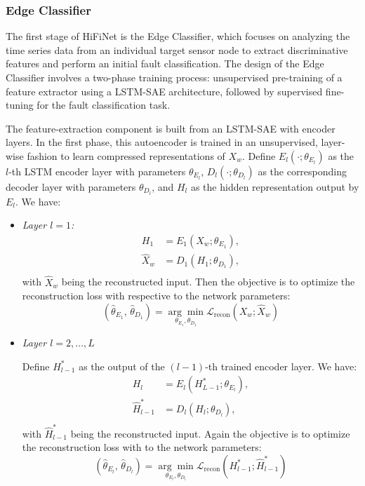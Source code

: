 \subsubsection{Edge Classifier}
The first stage of HiFiNet is the Edge Classifier, which focuses on analyzing the time series data from an individual target sensor node to extract discriminative features and perform an initial fault classification. The design of the Edge Classifier involves a two-phase training process: unsupervised pre-training of a feature extractor using a LSTM-SAE architecture, followed by supervised fine-tuning for the fault classification task.

The feature-extraction component is built from an LSTM-SAE with encoder layers. In the first phase, this autoencoder is trained in an unsupervised, layer-wise fashion to learn compressed representations of \(X_w\). Define \(E_l(\cdot; \theta_{E_l})\) as the \(l\)-th LSTM encoder layer with parameters \(\theta_{E_l}\), \(D_l(\cdot; \theta_{D_l})\) as the corresponding decoder layer with parameters \(\theta_{D_l}\), and \(H_l\) as the hidden representation output by \(E_l\). We have:
\begin{itemize}
  \item \emph{Layer \(l=1\):}
    \begin{equation}
      \begin{aligned}
        H_1 &= E_1(X_w; \theta_{E_1}), \\
        \hat X_w &= D_1(H_1; \theta_{D_1}), \\
      \end{aligned}
    \end{equation}
    with \(\hat X_w\) being the reconstructed input. Then the objective is to optimize the reconstruction loss with respective to the network parameters:
    \begin{equation}
      (\hat \theta_{E_1},\,\hat \theta_{D_1}) = \underset{\theta_{E_1}, \theta_{D_1}} {\arg\min} \mathcal L_{\text{recon}}(X_w; \hat X_w)
    \end{equation}
  \item \emph{Layer \(l = 2, \ldots, L\)}

    Define \(H^*_{l-1}\) as the output of the \((l-1)\)-th trained encoder layer. We have:
    \begin{equation}
      \begin{aligned}
        H_l &= E_l(H^*_{L-1}; \theta_{E_l}), \\ 
        \hat H^*_{l-1} &= D_l(H_l; \theta_{D_l}), \\
      \end{aligned}
    \end{equation}
    with \(\hat H^*_{l-1}\) being the reconstructed input. Again the objective is to optimize the reconstruction loss with to the network parameters:
\begin{equation}
(\hat \theta_{E_l},\,\hat \theta_{D_l}) = \underset{\theta_{E_l}, \theta_{D_l}} {\arg\min} \mathcal L_{\text{recon}}(H^*_{l-1}; \hat H^*_{l-1})
\end{equation}
\end{itemize}
